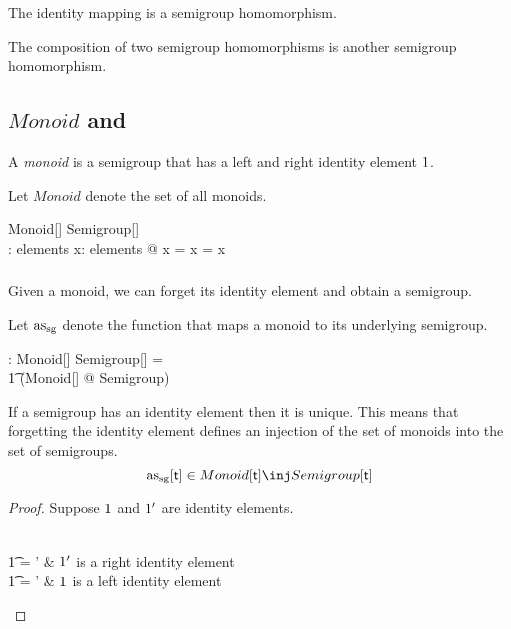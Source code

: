 \documentclass[12pt]{article}
\begin{document}
\begin{remark}
The identity mapping is a semigroup homomorphism.
\end{remark}

\begin{remark}
The composition of two semigroup homomorphisms is another semigroup homomorphism.
\end{remark}

\subsection{$Monoid$ and }

A {\em monoid} is a semigroup that has a left and right identity element $1$.

Let $Monoid$ denote the set of all monoids.

\begin{schema}{Monoid}[\genT]
Semigroup[\genT] \\
\oneG: \genT
\where
\oneG \in elements
\also
\forall x: elements @ \oneG \mulG x = x = x \mulG \oneG
\end{schema}

\subsubsection{}

Given a monoid, we can forget its identity element and obtain a semigroup.

Let $\operatorname{as_{sg}}$ denote the function that maps a monoid to its underlying semigroup.

\begin{gendef}[\genT]
\MonoidSemigroup: Monoid[\genT] \fun Semigroup[\genT]
\where
\MonoidSemigroup = \\
\t1	(\lambda Monoid[\genT] @ \theta Semigroup)
\end{gendef}

\begin{remark}
If a semigroup has an identity element then it is unique.
This means that forgetting the identity element defines an injection of the set of monoids into the set of
semigroups.
$$
\MonoidSemigroup[\genT] \in Monoid[\genT] \inj Semigroup[\genT]
$$
\end{remark}

\begin{proof}
Suppose $1$ and $1'$ are identity elements.
\begin{argue}
\oneG \\
\t1	= \oneG \mulG \oneG'	& $1'$ is a right identity element \\
\t1	= \oneG'				& $1$ is a left identity element
\end{argue}
\end{proof}
\end{document}
